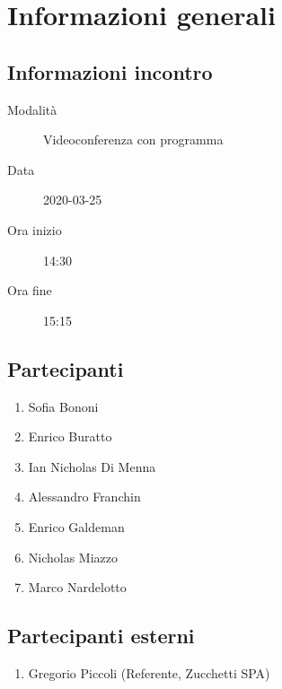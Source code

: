 \documentclass{article}
\begin{document}


\section{Informazioni generali}%
\label{sec:informazioni_generali}

\subsection{Informazioni incontro}%
\label{sub:informazioni_incontro}

\begin{description}
  \item[Modalità] Videoconferenza con programma 
  \item[Data] 2020-03-25
  \item[Ora inizio] 14:30
  \item[Ora fine] 15:15
\end{description}

\subsection{Partecipanti}%
\label{sub:partecipanti}

\begin{enumerate}
  \item Sofia Bononi
  \item Enrico Buratto
  \item Ian Nicholas Di Menna
  \item Alessandro Franchin
  \item Enrico Galdeman
  \item Nicholas Miazzo
  \item Marco Nardelotto
\end{enumerate}

\subsection{Partecipanti esterni}%
\label{sub:partecipanti esterni}

\begin{enumerate}
    \item Gregorio Piccoli (Referente, Zucchetti SPA)
\end{enumerate}
\end{document}
